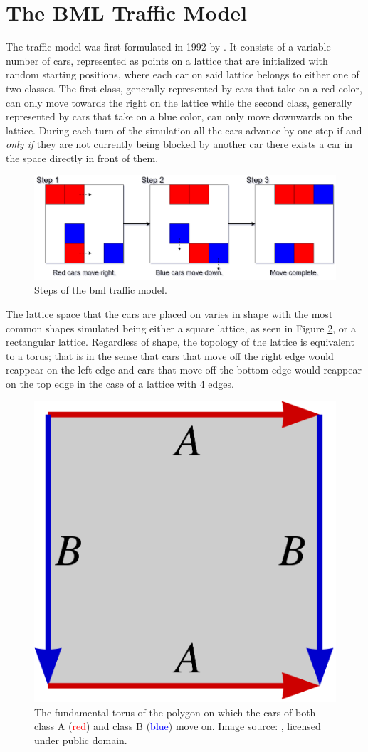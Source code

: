 \section{The BML Traffic Model}
\label{sec:The-BML-Traffic-Model}
The  traffic model was first formulated in 1992 by \citet{Biham}. It consists of a variable number of cars, represented as points on a lattice that are initialized with random starting positions, where each car on said lattice belongs to either one of two classes. The first class, generally represented by cars that take on a red color, can only move towards the right on the lattice while the second class, generally represented by cars that take on a blue color, can only move downwards on the lattice. During each turn of the simulation all the cars advance by one step if and \textit{only if} they are not currently being blocked by another car \ie there exists a car in the space directly in front of them.

\begin{figure}[htb!]
    \centering
    \includegraphics[width=\linewidth]{Images/Section 2/BML Step.png}
    \caption{Steps of the \gls{bml} traffic model.}
    \label{fig:BML-Step}
\end{figure}

\noindent The lattice space that the cars are placed on varies in shape with the most common shapes simulated being either a square lattice, as seen in Figure \ref{fig:BML-Torus}, or a rectangular lattice. Regardless of shape, the topology of the lattice is equivalent to a torus; that is in the sense that cars that move off the right edge would reappear on the left edge and cars that move off the bottom edge would reappear on the top edge in the case of a lattice with 4 edges.

\begin{figure}[htb!]
    \centering
    \includegraphics[width=0.25\linewidth]{Images/Section 2/BML Torus.png}
    \caption{The fundamental torus of the polygon on which the cars of both class A (\textcolor{red}{red}) and class B (\textcolor{blue}{blue}) move on. Image source: \cite{Wikipedia_Torus}, licensed under public domain.}
    \label{fig:BML-Torus}
\end{figure}

